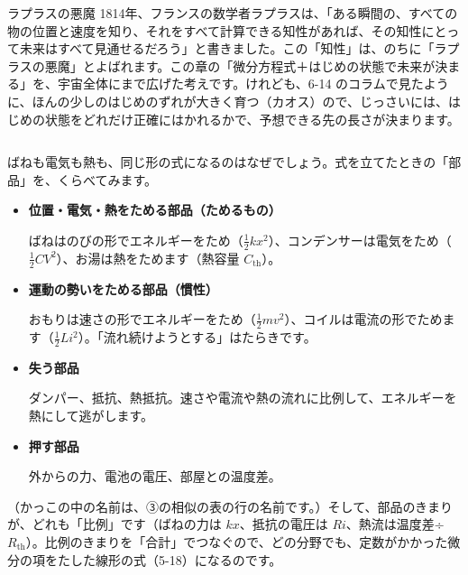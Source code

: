 \begin{column}{ラプラスの悪魔}
1814年、フランスの数学者ラプラスは、「ある瞬間の、すべての物の位置と速度を知り、それをすべて計算できる知性があれば、その知性にとって未来はすべて見通せるだろう」と書きました。この「知性」は、のちに「ラプラスの悪魔」とよばれます。この章の「微分方程式＋はじめの状態で未来が決まる」を、宇宙全体にまで広げた考えです。けれども、6-14 のコラムで見たように、ほんの少しのはじめのずれが大きく育つ（カオス）ので、じっさいには、はじめの状態をどれだけ正確にはかれるかで、予想できる先の長さが決まります。
\end{column}


\label{bk:6-15:buhin}ばねも電気も熱も、同じ形の式になるのはなぜでしょう。式を立てたときの「部品」を、くらべてみます。

\begin{bkfigure}
\end{bkfigure}

\begin{itemize}[leftmargin=1.2\zw, itemsep=3pt, topsep=2pt, label={\color{\bkTT}●}]
\item \textbf{位置・電気・熱をためる部品（ためるもの）}\par\noindent ばねはのびの形でエネルギーをため（$\frac12kx^2$）、コンデンサーは電気をため（$\frac12CV^2$）、お湯は熱をためます（熱容量 $C_{\mathrm{th}}$）。
\item \textbf{運動の勢いをためる部品（慣性）}\par\noindent おもりは速さの形でエネルギーをため（$\frac12mv^2$）、コイルは電流の形でためます（$\frac12Li^2$）。「流れ続けようとする」はたらきです。
\item \textbf{失う部品}\par\noindent ダンパー、抵抗、熱抵抗。速さや電流や熱の流れに比例して、エネルギーを熱にして逃がします。
\item \textbf{押す部品}\par\noindent 外からの力、電池の電圧、部屋との温度差。
\end{itemize}
（かっこの中の名前は、③の相似の表の行の名前です。）そして、部品のきまりが、どれも「比例」です（ばねの力は $kx$、抵抗の電圧は $Ri$、熱流は温度差÷$R_{\mathrm{th}}$）。比例のきまりを「合計」でつなぐので、どの分野でも、定数がかかった微分の項をたした線形の式（5-18）になるのです。

